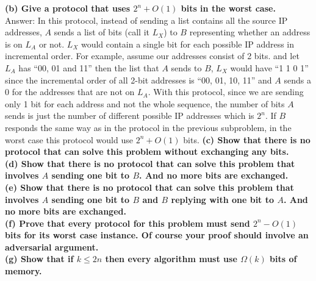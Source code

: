\documentclass{article}
\begin{document}
\textbf{(b) Give a protocol that uses $2^n + O(1)$ bits in the worst case. } \\ \newline
Answer: In this protocol, instead of sending a list contains all the source IP addresses, $A$ sends a list of bits (call it $L_X$) to $B$ representing whether an address is on $L_A$ or not. $L_X$ would contain a single bit for each possible IP address in incremental order. For example, assume our addresses consist of 2 bits. and let $L_A$ has ``00, 01 and 11''  then the list that $A$ sends to $B$, $L_X$ would have ``1 1 0 1'' since the incremental order of all 2-bit addresses is ``00, 01, 10, 11'' and $A$ sends a 0 for the addresses that are not on $L_A$. With this protocol, since we are sending only 1 bit for each address and not the whole sequence, the number of bits $A$ sends is just the number of different possible IP addresses which is $2^n$. If $B$ responds the same way as in the protocol in the previous subproblem, in the worst case this protocol would use $2^n + O(1)$ bits.
\textbf{(c) Show that there is no protocol that can solve this problem without exchanging any bits.} \\ \newline
\textbf{(d) Show that there is no protocol that can solve this problem that involves $A$ sending one bit to $B$. And no more bits are exchanged.} \\ \newline
\textbf{(e) Show that there is no protocol that can solve this problem that involves $A$ sending one bit to $B$ and $B$ replying with one bit to $A$. And no more bits are exchanged.} \\ \newline
\textbf{(f) Prove that every protocol for this problem must send $2^n - O(1)$ bits for its worst case instance. Of course your proof should involve an adversarial argument.} \\ \newline
\textbf{(g) Show that if $k\leq 2n$ then every algorithm must use $\Omega(k)$ bits of memory.} \\ \newline
\end{document}
